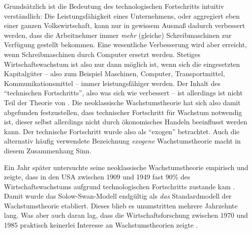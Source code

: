 Grundsätzlich ist die Bedeutung des technologischen Fortschritts intuitiv verständlich: Die Leistungsfähigkeit eines Unternehmens, oder aggregiert eben einer ganzen Volkswirtschaft, kann nur in gewissem Ausmaß dadurch verbessert werden, dass die Arbeitnehmer immer \textit{mehr} (gleiche) Schreibmaschinen zur Verfügung gestellt bekommen. Eine wesentliche Verbesserung wird aber erreicht, wenn Schreibmaschinen durch Computer ersetzt werden. Stetiges Wirtschaftswachstum ist also nur dann möglich ist, wenn sich die eingesetzten Kapitalgüter – also zum Beispiel Maschinen, Computer, Transportmittel, Kommunikationsmittel – immer leistungsfähiger werden. Der Inhalt des "`technischen Fortschritts"', also was sich wie verbessert – ist allerdings ist nicht Teil der Theorie von \textcite{Solow1956}. Die neoklassische Wachstumstheorie hat sich also damit abgefunden festzustellen, dass technischer Fortschritt für Wachstum notwendig ist, dieser selbst allerdings nicht durch ökonomisches Handeln beeinflusst werden kann. Der technische Fortschritt wurde also als "`exogen"' betrachtet.  Auch die alternativ häufig verwendete Bezeichnung \textit{exogene} Wachstumstheorie macht in diesem Zusammenhang Sinn. 

Ein Jahr später untersuchte \textcite{Solow1957} seine neoklassische Wachstumstheorie empirisch und zeigte, dass in den USA zwischen 1909 und 1949 fast 90\% des Wirtschaftswachstums aufgrund technologischen Fortschritts zustande kam \parencite[S. 320]{Solow1957}. Damit wurde das Solow-Swan-Modell endgültig als \textit{das} Standardmodell der Wachstumstheorie etabliert. Dieses blieb es unumstritten mehrere Jahrzehnte lang. Was aber auch daran lag, dass die Wirtschaftsforschung zwischen 1970 und 1985 praktisch keinerlei Interesse an Wachstumstheorien zeigte \parencite[S. 586]{Snowdon2005}. 

